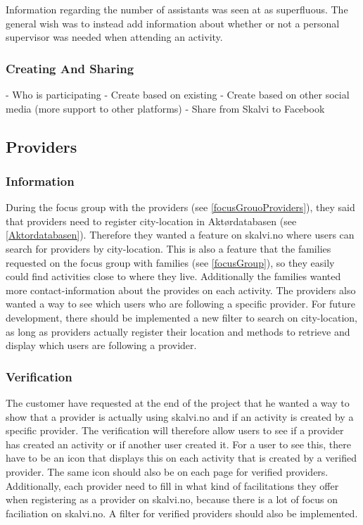 Information regarding the number of assistants was seen at as superfluous. The general wish was to instead add information about whether or not a personal supervisor was needed when attending an activity.

\subsubsection{Creating And Sharing}


- Who is participating
- Create based on existing
- Create based on other social media (more support to other platforms)
- Share from Skalvi to Facebook

\subsection{Providers}
\subsubsection{Information}
During the focus group with the providers (see \ref{focusGrouoProviders}), they said that providers need to register city-location in Aktørdatabasen (see \ref{Aktordatabasen}). Therefore they wanted a feature on skalvi.no where users can search for providers by city-location. This is also a feature that the families requested on the focus group with families (see \ref{focusGroup}), so they easily could find activities close to where they live. Additionally the families wanted more contact-information about the provides on each activity.  The providers also wanted a way to see which users who are following a specific provider.
For future development, there should be implemented a new filter to search on city-location, as long as providers actually register their location and methods to retrieve and display which users are following a provider.

\subsubsection{Verification}
The customer have requested at the end of the project that he wanted a way to show that a provider is actually using skalvi.no and if an activity is created by a specific provider. The verification will therefore allow users to see if a provider has created an activity or if another user created it. For a user to see this, there have to be an icon that displays this on each activity that is created by a verified provider. The same icon should also be on each page for verified providers. Additionally, each provider need to fill in what kind of facilitations they offer when registering as a provider on skalvi.no, because there is a lot of focus on faciliation on skalvi.no. A filter for verified providers should also be implemented.


